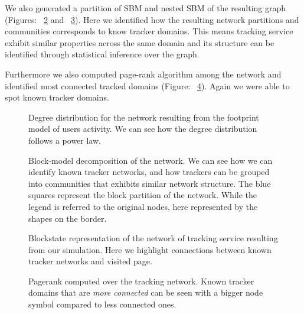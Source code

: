 We also generated a partition of SBM and nested SBM of the resulting graph (Figures: ~\ref{blockmodel} and ~\ref{blockstate}). Here we identified how the resulting network partitions and communities corresponds to know tracker domains. This means tracking service exhibit similar properties across the same domain and its structure can be identified through statistical inference over the graph.

Furthermore we also computed page-rank algorithm among the network and identified most connected tracked domains (Figure: ~\ref{pagerank}). Again we were able to spot known tracker domains.

\setcounter{figure}{4}
\begin{figure}
\centerline{\epsfxsize=350pt}
\caption{\label{deg-dist} Degree distribution for the network resulting from the footprint model of users activity. We can see how the degree distribution follows a power law.}
\end{figure}

\setcounter{figure}{5}
\begin{figure}
\centerline{\epsfxsize=350pt}
\caption{\label{blockmodel} Block-model decomposition of the network. We can see how we can identify known tracker networks, and how trackers can be grouped into communities that exhibits similar network structure. The blue squares represent the block partition of the network. While the legend is referred to the original nodes, here represented by the shapes on the border.
}
\end{figure}

\setcounter{figure}{6}
\begin{figure}
\centerline{\epsfxsize=350pt}
\caption{\label{blockstate} Blockstate representation of the network of tracking service resulting from our simulation. Here we highlight connections between known tracker networks and visited page.}
\end{figure}

\setcounter{figure}{7}
\begin{figure}
\centerline{\epsfxsize=350pt}
\caption{\label{pagerank} Pagerank computed over the tracking network. Known tracker domains that are \emph{more connected} can be seen with a bigger node symbol compared to less connected ones.}
\end{figure}

